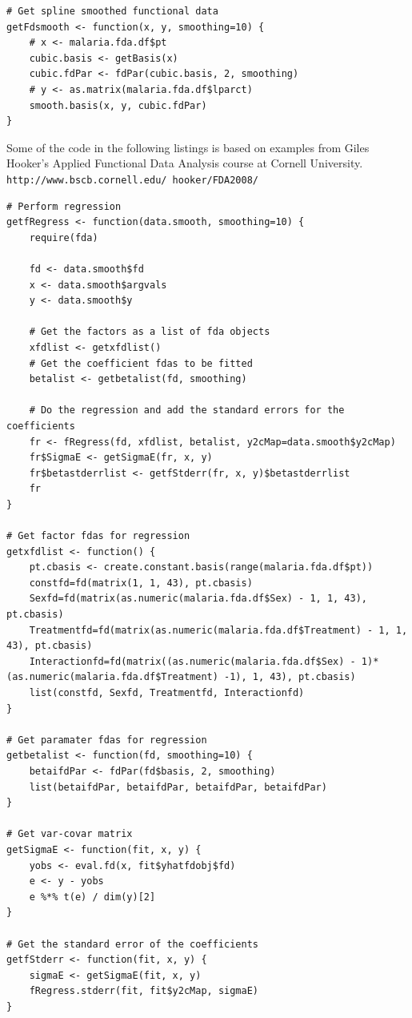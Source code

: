 \begin{singlespace}
\begin{lstlisting}[caption=Functions for cubic spline smoothing,label=R:fdsmooth]
# Get spline smoothed functional data
getFdsmooth <- function(x, y, smoothing=10) {
	# x <- malaria.fda.df$pt
	cubic.basis <- getBasis(x)
	cubic.fdPar <- fdPar(cubic.basis, 2, smoothing)
	# y <- as.matrix(malaria.fda.df$lparct)
	smooth.basis(x, y, cubic.fdPar)
}
\end{lstlisting}

Some of the code in the following listings is based on examples from Giles Hooker's Applied Functional Data Analysis course at Cornell University.\\
\texttt{http://www.bscb.cornell.edu/~hooker/FDA2008/}
\begin{lstlisting}[caption=Functions for fda regression,label=R:fregress]
# Perform regression
getfRegress <- function(data.smooth, smoothing=10) {
	require(fda)

	fd <- data.smooth$fd
	x <- data.smooth$argvals
	y <- data.smooth$y

	# Get the factors as a list of fda objects
	xfdlist <- getxfdlist()
	# Get the coefficient fdas to be fitted
	betalist <- getbetalist(fd, smoothing)

	# Do the regression and add the standard errors for the coefficients
	fr <- fRegress(fd, xfdlist, betalist, y2cMap=data.smooth$y2cMap)
	fr$SigmaE <- getSigmaE(fr, x, y)
	fr$betastderrlist <- getfStderr(fr, x, y)$betastderrlist
	fr
}

# Get factor fdas for regression
getxfdlist <- function() {
	pt.cbasis <- create.constant.basis(range(malaria.fda.df$pt))
	constfd=fd(matrix(1, 1, 43), pt.cbasis)
	Sexfd=fd(matrix(as.numeric(malaria.fda.df$Sex) - 1, 1, 43), pt.cbasis)
	Treatmentfd=fd(matrix(as.numeric(malaria.fda.df$Treatment) - 1, 1, 43), pt.cbasis)
	Interactionfd=fd(matrix((as.numeric(malaria.fda.df$Sex) - 1)*(as.numeric(malaria.fda.df$Treatment) -1), 1, 43), pt.cbasis)
	list(constfd, Sexfd, Treatmentfd, Interactionfd)
}

# Get paramater fdas for regression
getbetalist <- function(fd, smoothing=10) {
	betaifdPar <- fdPar(fd$basis, 2, smoothing)
	list(betaifdPar, betaifdPar, betaifdPar, betaifdPar)
}

# Get var-covar matrix
getSigmaE <- function(fit, x, y) {
	yobs <- eval.fd(x, fit$yhatfdobj$fd)
	e <- y - yobs
	e %*% t(e) / dim(y)[2]
}

# Get the standard error of the coefficients
getfStderr <- function(fit, x, y) {
	sigmaE <- getSigmaE(fit, x, y)
	fRegress.stderr(fit, fit$y2cMap, sigmaE)
}
\end{lstlisting}


\end{singlespace}
